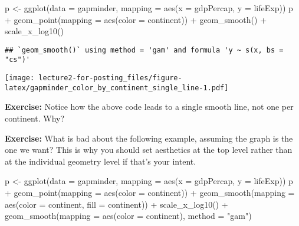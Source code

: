 \documentclass[
]{article}
\newenvironment{Shaded}{\begin{snugshade}}{\end{snugshade}}
\newcommand{\AttributeTok}[1]{\textcolor[rgb]{0.77,0.63,0.00}{#1}}
\newcommand{\FunctionTok}[1]{\textcolor[rgb]{0.00,0.00,0.00}{#1}}
\newcommand{\NormalTok}[1]{#1}
\newcommand{\OtherTok}[1]{\textcolor[rgb]{0.56,0.35,0.01}{#1}}
\newcommand{\SpecialCharTok}[1]{\textcolor[rgb]{0.00,0.00,0.00}{#1}}
\newcommand{\StringTok}[1]{\textcolor[rgb]{0.31,0.60,0.02}{#1}}
\begin{document}
\begin{Shaded}
\begin{Highlighting}[]
\NormalTok{p }\OtherTok{\textless{}{-}} \FunctionTok{ggplot}\NormalTok{(}\AttributeTok{data =}\NormalTok{ gapminder,}
            \AttributeTok{mapping =} \FunctionTok{aes}\NormalTok{(}\AttributeTok{x =}\NormalTok{ gdpPercap, }\AttributeTok{y =}\NormalTok{ lifeExp))}
\NormalTok{p }\SpecialCharTok{+} \FunctionTok{geom\_point}\NormalTok{(}\AttributeTok{mapping =} \FunctionTok{aes}\NormalTok{(}\AttributeTok{color =}\NormalTok{ continent)) }\SpecialCharTok{+} \FunctionTok{geom\_smooth}\NormalTok{() }\SpecialCharTok{+} \FunctionTok{scale\_x\_log10}\NormalTok{()}
\end{Highlighting}
\end{Shaded}

\begin{verbatim}
## `geom_smooth()` using method = 'gam' and formula 'y ~ s(x, bs = "cs")'
\end{verbatim}

\texttt{[image: lecture2-for-posting\_files/figure-latex/gapminder\_color\_by\_continent\_single\_line-1.pdf]}

\textbf{Exercise:} Notice how the above code leads to a single smooth
line, not one per continent. Why?

\textbf{Exercise:} What is bad about the following example, assuming the
graph is the one we want? This is why you should set aesthetics at the
top level rather than at the individual geometry level if that's your
intent.

\begin{Shaded}
\begin{Highlighting}[]
\NormalTok{p }\OtherTok{\textless{}{-}} \FunctionTok{ggplot}\NormalTok{(}\AttributeTok{data =}\NormalTok{ gapminder,}
            \AttributeTok{mapping =} \FunctionTok{aes}\NormalTok{(}\AttributeTok{x =}\NormalTok{ gdpPercap, }\AttributeTok{y =}\NormalTok{ lifeExp))}
\NormalTok{p }\SpecialCharTok{+} \FunctionTok{geom\_point}\NormalTok{(}\AttributeTok{mapping =} \FunctionTok{aes}\NormalTok{(}\AttributeTok{color =}\NormalTok{ continent)) }\SpecialCharTok{+} 
  \FunctionTok{geom\_smooth}\NormalTok{(}\AttributeTok{mapping =} \FunctionTok{aes}\NormalTok{(}\AttributeTok{color =}\NormalTok{ continent, }\AttributeTok{fill =}\NormalTok{ continent)) }\SpecialCharTok{+} 
  \FunctionTok{scale\_x\_log10}\NormalTok{() }\SpecialCharTok{+} 
  \FunctionTok{geom\_smooth}\NormalTok{(}\AttributeTok{mapping =} \FunctionTok{aes}\NormalTok{(}\AttributeTok{color =}\NormalTok{ continent), }\AttributeTok{method =} \StringTok{"gam"}\NormalTok{)}
\end{Highlighting}
\end{Shaded}
\end{document}
